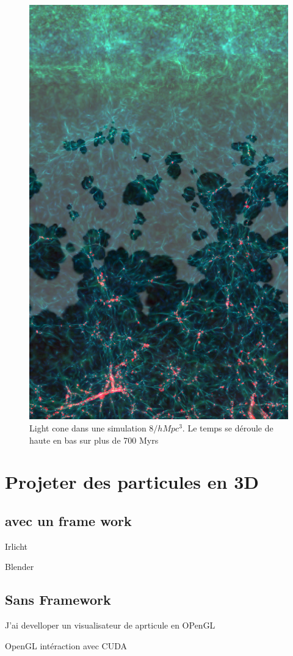 \begin{figure}[bth]
        \includegraphics[height=.95\textheight]{img/04/frise_wall.png} 
        \caption{Light cone dans une simulation $8/h Mpc ^3$. Le temps se déroule de haute en bas sur plus de 700 Myrs }
 		\label{fig:lightcone}
\end{figure}

\section{Projeter des particules en 3D}

\subsection{avec un frame work} 
Irlicht

Blender 



\subsection{Sans Framework}

J'ai develloper un visualisateur de aprticule en OPenGL

OpenGL
intéraction avec CUDA


